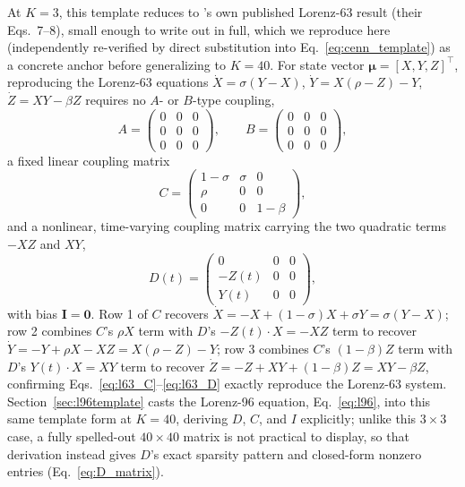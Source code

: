 \documentclass[final,5p,times,twocolumn,authoryear]{elsarticle}
\begin{document}
At $K=3$, this template reduces to \citet{magno2025}'s own published
Lorenz-63 result (their Eqs.~7--8), small enough to write out in
full, which we reproduce here (independently re-verified by direct
substitution into Eq.~\eqref{eq:cenn_template}) as a concrete anchor
before generalizing to $K=40$. For state vector
$\boldsymbol{\mu}=[X,Y,Z]^\top$, reproducing the Lorenz-63 equations
$\dot{X}=\sigma(Y-X)$, $\dot{Y}=X(\rho-Z)-Y$, $\dot{Z}=XY-\beta Z$
requires no $A$- or $B$-type coupling,
\begin{equation}
A = \begin{pmatrix} 0&0&0\\0&0&0\\0&0&0\end{pmatrix}, \qquad
B = \begin{pmatrix} 0&0&0\\0&0&0\\0&0&0\end{pmatrix},
\label{eq:l63_AB}
\end{equation}
a fixed linear coupling matrix
\begin{equation}
C = \begin{pmatrix} 1-\sigma & \sigma & 0 \\ \rho & 0 & 0 \\ 0 & 0 & 1-\beta \end{pmatrix},
\label{eq:l63_C}
\end{equation}
and a nonlinear, time-varying coupling matrix carrying the two
quadratic terms $-XZ$ and $XY$,
\begin{equation}
D(t) = \begin{pmatrix} 0&0&0 \\ -Z(t)&0&0 \\ Y(t)&0&0 \end{pmatrix},
\label{eq:l63_D}
\end{equation}
with bias $\mathbf{I}=\mathbf{0}$. Row 1 of $C$ recovers
$\dot{X}=-X+(1-\sigma)X+\sigma Y=\sigma(Y-X)$; row 2 combines $C$'s
$\rho X$ term with $D$'s $-Z(t)\cdot X=-XZ$ term to recover
$\dot{Y}=-Y+\rho X-XZ=X(\rho-Z)-Y$; row 3 combines $C$'s $(1-\beta)Z$
term with $D$'s $Y(t)\cdot X=XY$ term to recover
$\dot{Z}=-Z+XY+(1-\beta)Z=XY-\beta Z$, confirming
Eqs.~\eqref{eq:l63_C}--\eqref{eq:l63_D} exactly reproduce the
Lorenz-63 system. Section~\ref{sec:l96template} casts the Lorenz-96
equation, Eq.~\eqref{eq:l96}, into this same template form at
$K=40$, deriving $D$, $C$, and $I$ explicitly; unlike this $3\times3$
case, a fully spelled-out $40\times40$ matrix is not practical to
display, so that derivation instead gives $D$'s exact sparsity
pattern and closed-form nonzero entries (Eq.~\eqref{eq:D_matrix}).
\end{document}
